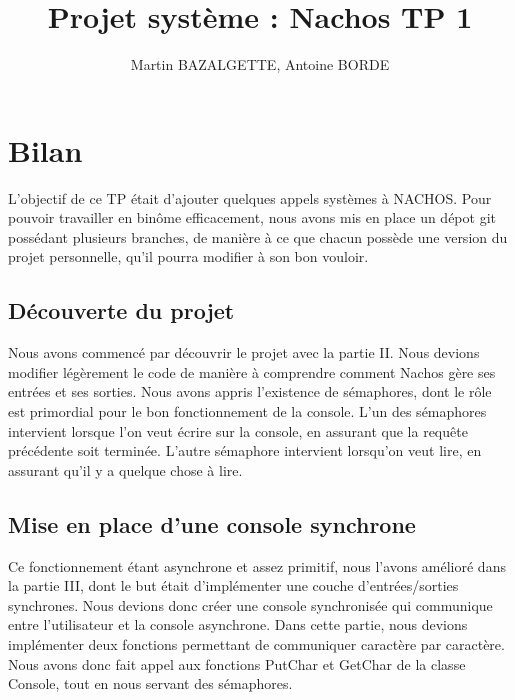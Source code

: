 \documentclass[12pt]{article}
\begin{document}
\title{Projet système : Nachos TP 1}
\author{Martin BAZALGETTE, Antoine BORDE}

\maketitle
\newpage
\tableofcontents
\newpage

\section{Bilan}
L'objectif de ce TP était d'ajouter quelques appels systèmes à NACHOS.
\newline
Pour pouvoir travailler en binôme efficacement, nous avons mis en place un dépot git possédant plusieurs branches, de manière à ce que chacun possède une version du projet personnelle, qu'il pourra modifier à son bon vouloir.
\bigbreak
\subsection{Découverte du projet}
Nous avons commencé par découvrir le projet avec la partie II. Nous devions modifier légèrement le code de manière à comprendre comment Nachos gère ses entrées et ses sorties.
Nous avons appris l'existence de sémaphores, dont le rôle est primordial pour le bon fonctionnement de la console.
L'un des sémaphores intervient lorsque l'on veut écrire sur la console, en assurant que la requête précédente soit terminée. L'autre sémaphore intervient lorsqu'on veut lire, en assurant qu'il y a quelque chose à lire.
\bigbreak
\subsection{Mise en place d'une console synchrone}
Ce fonctionnement étant asynchrone et assez primitif, nous l'avons amélioré dans la partie III, dont le but était d'implémenter une couche d'entrées/sorties synchrones. Nous devions donc créer une console synchronisée qui communique entre l'utilisateur et la console asynchrone.
Dans cette partie, nous devions implémenter deux fonctions permettant de communiquer caractère par caractère. Nous avons donc fait appel aux fonctions \textcolor{red2}{PutChar} et \textcolor{red2}{GetChar} de la classe Console, tout en nous servant des sémaphores.
\bigbreak
\end{document}
